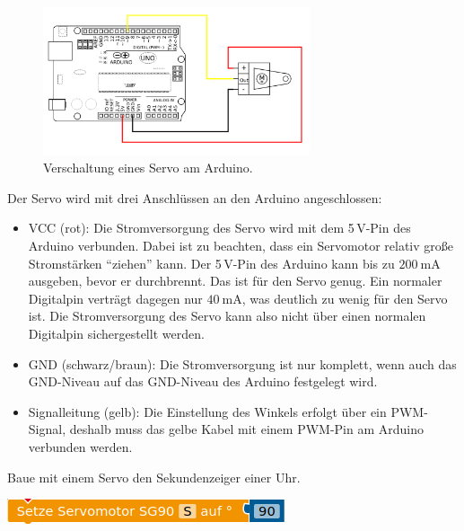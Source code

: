 \begin{figure}[H]
	\centering
	\includegraphics[width=0.7\textwidth]{./Zeichnungen/schaltplan-servo.png}
	\caption{Verschaltung eines Servo am Arduino.}
\end{figure}

Der Servo wird mit drei Anschlüssen an den Arduino angeschlossen:

\begin{itemize}[itemsep=0mm, parsep=0mm]
	\item VCC (rot): Die Stromversorgung des Servo wird mit dem 5\,V-Pin des Arduino verbunden. Dabei ist zu beachten, dass ein Servomotor relativ große Stromstärken \enquote{ziehen} kann. Der 5\,V-Pin des Arduino kann bis zu $\SI{200}{\milli\ampere}$ ausgeben, bevor er durchbrennt. Das ist für den Servo genug. Ein normaler Digitalpin verträgt dagegen nur $\SI{40}{\milli\ampere}$, was deutlich zu wenig für den Servo ist. Die Stromversorgung des Servo kann also nicht über einen normalen Digitalpin sichergestellt werden.
	\item GND (schwarz/braun): Die Stromversorgung ist nur komplett, wenn auch das GND-Niveau auf das GND-Niveau des Arduino festgelegt wird.
	\item Signalleitung (gelb): Die Einstellung des Winkels erfolgt über ein PWM-Signal, deshalb muss das gelbe Kabel mit einem PWM-Pin am Arduino verbunden werden.
\end{itemize}

\begin{projekt}[Uhr]\label{proj:uhr}
	\begin{minipage}{0.6\textwidth}
		Baue mit einem Servo den Sekundenzeiger einer Uhr.		
	\end{minipage}
	\hfill
	\begin{minipage}{0.38\textwidth}
		\centering
		\includegraphics[width=\textwidth]{./pics/servo-steuerung.png}
	\end{minipage}
\end{projekt}

